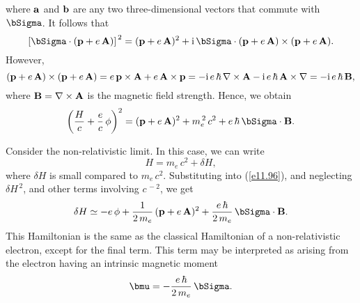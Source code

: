 where ${\bf a}$ and ${\bf b}$ are any two three-dimensional vectors that commute with $\bSigma$. 
It follows that
\begin{equation}
 \left[\bSigma\cdot({\bf p}+e\,{\bf A})\right]^{\,2} = ({\bf p}+e\,{\bf A})^2 + {\rm i}\,\bSigma\cdot ({\bf p}+e\,{\bf A})\times ({\bf p}+e\,{\bf A}).
 \end{equation}
 However,
 \begin{equation}
 ({\bf p}+e\,{\bf A})\times ({\bf p}+e\,{\bf A}) = e\,{\bf p}\times {\bf A} +e\,{\bf A}\times {\bf p} = -{\rm i}\,e\,\hbar\,\nabla\times {\bf A} -{ \rm i}\,e\,\hbar\,{\bf A}\times \nabla = -{\rm i}\,e\,\hbar\,{\bf B},
 \end{equation}
 where ${\bf B} = \nabla\times {\bf A}$ is the magnetic field strength. 
 Hence, we obtain
 \begin{equation}\label{e11.96}
 \left(\frac{H}{c}+\frac{e}{c}\,\phi\right)^2 = ({\bf p}+e\,{\bf A})^2 + m_e^{\,2}\,c^2+e\,\hbar\,\bSigma\cdot{\bf B}.
 \end{equation}
 
 Consider the non-relativistic limit. In this case, we can write
 \begin{equation}
 H = m_e\,c^2+ \delta H,
 \end{equation}
 where $\delta H$ is small compared to $m_e\,c^2$. Substituting into (\ref{e11.96}), and neglecting $\delta H^{\,2}$, and other
 terms involving $c^{\,-2}$, we get
 \begin{equation}
 \delta H\simeq -e\,\phi + \frac{1}{2\,m_e}\,({\bf p} + e\,{\bf A})^2 + \frac{e\,\hbar}{2\,m_e}\,\bSigma\cdot{\bf B}.
 \end{equation}
 This Hamiltonian is the same as the classical Hamiltonian of a non-relativistic electron, except for the final term. 
 This term may be interpreted as arising from the electron having an intrinsic  magnetic moment 
 \begin{equation}\label{e11.99}
 \bmu = - \frac{e\,\hbar}{2\,m_e}\,\bSigma.
 \end{equation}
 
